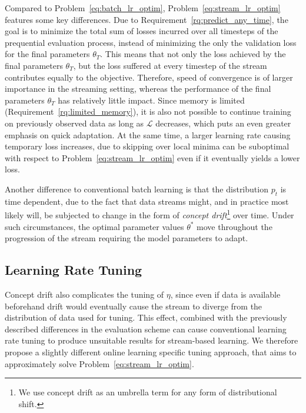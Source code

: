 \documentclass[letterpaper]{article} %
\begin{document}
Compared to Problem~\eqref{eq:batch_lr_optim}, Problem~\eqref{eq:stream_lr_optim} features some key differences.
Due to Requirement~\ref{rq:predict_any_time}, the goal is to minimize the total sum of losses incurred over all timesteps of the prequential evaluation process,  instead of minimizing the only the validation loss for the final parameters $\theta_T$.
This means that not only the loss achieved by the final parameters $\theta_T$, but the loss suffered at every timestep of the stream contributes equally to the objective.
Therefore, speed of convergence is of larger importance in the streaming setting, whereas the performance of the final parameters $\theta_T$ has relatively little impact.
Since memory is limited (Requirement~\ref{rq:limited_memory}), it is also not possible to continue training on previously observed data as long as $\mathcal{L}$ decreases, which puts an even greater emphasis on quick adaptation.
At the same time, a larger learning rate causing temporary loss increases, due to skipping over local minima can be suboptimal with respect to Problem~\ref{eq:stream_lr_optim} even if it eventually yields a lower loss.

Another difference to conventional batch learning is that the distribution $p_t$ is time dependent, due to the fact that data streams might, and in practice most likely will, be subjected to change in the form of \textit{concept drift}\footnote{We use concept drift as an umbrella term for any form of distributional shift.} over time.
Under such circumstances, the optimal parameter values $\theta^*$ move throughout the progression of the stream requiring the model parameters to adapt.



\subsection{Learning Rate Tuning}

Concept drift also complicates the tuning of $\eta$, since even if data is available beforehand drift would eventually cause the stream to diverge from the distribution of data used for tuning.
This effect, combined with the previously described differences in the evaluation scheme can cause conventional learning rate tuning to produce unsuitable results for stream-based learning.
We therefore propose a slightly different online learning specific tuning approach, that aims to approximately solve Problem~\ref{eq:stream_lr_optim}.
\end{document}
